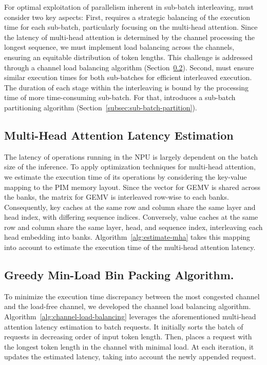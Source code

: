 %
For optimal exploitation of parallelism inherent in sub-batch interleaving, \neupims must consider two key aspects:
First, \neupims requires a strategic balancing of the execution time for each sub-batch, particularly focusing on the multi-head attention.
Since the latency of multi-head attention is determined by the channel processing the longest sequence, we must implement load balancing across the channels, ensuring an equitable distribution of token lengths.
This challenge is addressed through a channel load balancing algorithm (Section~\ref{subsec:channel-load-balancing}).
Second, \neupims must ensure similar execution times for both sub-batches for efficient interleaved execution.
The duration of each stage within the interleaving is bound by the processing time of more time-consuming sub-batch.
For that, \neupims introduces a sub-batch partitioning algorithm (Section~\ref{subsec:sub-batch-partition}).



\subsection{Multi-Head Attention Latency Estimation}
\label{subsec:estimate-mha}
%
The latency of operations running in the NPU is largely dependent on the batch size of the inference. 
%
%
To apply optimization techniques for multi-head attention, we estimate the execution time of its operations by considering the key-value mapping to the PIM memory layout. 
%
Since the vector for GEMV is shared across the banks, the matrix for GEMV is interleaved row-wise to each banks.
%
Consequently, key caches at the same row and column share the same layer and head index, with differing sequence indices. 
%
Conversely, value caches at the same row and column share the same layer, head, and sequence index, interleaving each head embedding into banks. 
%
Algorithm~\ref{alg:estimate-mha} takes this mapping into account to estimate the execution time of the multi-head attention latency.


\subsection{Greedy Min-Load Bin Packing Algorithm.}
\label{subsec:channel-load-balancing}

To minimize the execution time discrepancy between the most
congested channel and the load-free channel, we developed
the channel load balancing algorithm. Algorithm~\ref{alg:channel-load-balancing} leverages
the aforementioned multi-head attention latency estimation
to batch requests. It initially sorts the batch of requests in
decreasing order of input token length. Then, \neupims
places a request with the longest token length in the channel
with minimal load. At each iteration, it updates the estimated
latency, taking into account the newly appended request.

